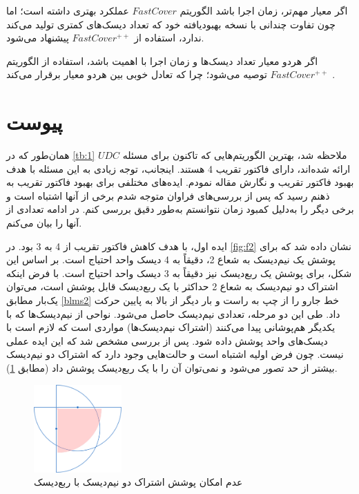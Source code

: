 \documentclass[12pt]{article}
\begin{document}
اگر معیار مهم‌تر، زمان اجرا باشد الگوریتم $FastCover$ عملکرد بهتری داشته است؛ اما چون تفاوت چندانی با نسخه بهبودیافته خود که تعداد دیسک‌های کمتری تولید می‌کند ندارد، استفاده از $FastCover^{++}$ پیشنهاد می‌شود.

اگر هردو معیار تعداد دیسک‌ها و زمان اجرا با اهمیت باشد، استفاده از الگوریتم $FastCover^{++}$ توصیه می‌شود؛ چرا که تعادل خوبی بین هردو معیار برقرار می‌کند \cite{friederich2022experiments}.



\newpage
{
\fontsize{12pt}{10pt}\selectfont


}
\newpage



\section*{پیوست}

همان‌طور که در
\cref{tb:1}
ملاحظه شد، بهترین الگوریتم‌هایی که تاکنون برای مسئله $UDC$ ارائه شده‌اند، دارای فاکتور تقریب 4 هستند. اینجانب، توجه زیادی به این مسئله با هدف بهبود فاکتور تقریب و نگارش مقاله نمودم. ایده‌های مختلفی برای بهبود فاکتور تقریب به ذهنم رسید که پس از بررسی‌های فراوان متوجه شدم برخی از آنها اشتباه است و برخی دیگر را به‌دلیل کمبود زمان نتوانستم به‌طور دقیق بررسی کنم. در ادامه تعدادی از آنها را بیان می‌کنم.

ایده اول، با هدف کاهش فاکتور تقریب از 4 به 3 بود. در
\cref{fig:f2}
نشان داده شد که برای پوشش یک نیم‌دیسک به شعاع 2، دقیقاً به 4 دیسک واحد احتیاج است. بر اساس این شکل، برای پوشش یک ربع‌دیسک نیز دقیقاً به 3 دیسک واحد احتیاج است. با فرض اینکه اشتراک دو نیم‌دیسک به شعاع 2 حداکثر با یک ربع‌دیسک قابل پوشش است، می‌توان یک‌بار مطابق
\cref{blms2}
خط جارو را از چپ به راست و بار دیگر از بالا به پایین حرکت داد. طی این دو مرحله، تعدادی نیم‌دیسک حاصل می‌شود. نواحی از نیم‌دیسک‌ها که با یکدیگر هم‌پوشانی پیدا می‌کنند (اشتراک نیم‌دیسک‌ها) مواردی است که لازم است با دیسک‌های واحد پوشش داده شود. پس از بررسی مشخص شد که این ایده عملی نیست. چون فرض اولیه اشتباه است و حالت‌هایی وجود دارد که اشتراک دو نیم‌دیسک بیشتر از حد تصور می‌شود و نمی‌توان آن را با یک ربع‌دیسک پوشش داد (مطابق \cref{fig:app1}).

\begin{figure}[!h]
\centering
\includegraphics[width=0.3\textwidth]{figs/app1}
\caption{
عدم امکان پوشش اشتراک دو نیم‌دیسک با ربع‌دیسک
}
\label{fig:app1}
\end{figure}
\end{document}
